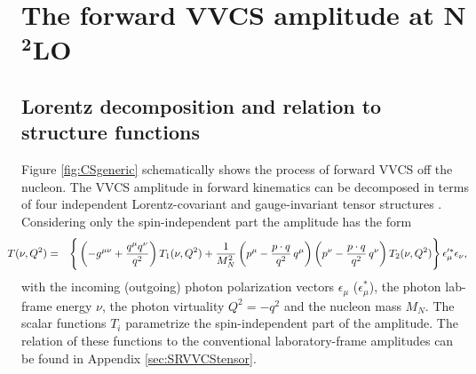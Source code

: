 \documentclass[11pt,preprint,tightenlines,
showpacs,preprintnumbers,amsmath,amssymb,superscriptaddress,a4paper,nofootinbib]{revtex4-1}
\def\bea{\begin{eqnarray}}
\def\eea{\end{eqnarray}}
\def\eqlab#1{\label{eq:#1}}
\def\seclab#1{\label{sec:#1}}
\def\nn{\nonumber}
\begin{document}
\section{The forward VVCS amplitude at N$\boldsymbol{^2}$LO} 
\label{Sec:ChEFT_for_VVCS}



\subsection{Lorentz decomposition and relation to structure functions} \seclab{LorentzDecomp}

Figure \ref{fig:CSgeneric} schematically shows the process of forward VVCS off the nucleon. 
The VVCS amplitude in forward kinematics can be decomposed in terms of four
independent Lorentz-covariant and gauge-invariant tensor structures
\cite{Hagelstein:2015egb}. Considering only the spin-independent part the amplitude has the form
\bea
\label{Eq:T-Rel}
\hspace{-0.5cm}T(\nu,Q^2) & = &  \Bigg\{ 
\left( -g^{\mu\nu}+\frac{q^{\mu}q^{\nu}}{q^2}\right)
T_1(\nu, Q^2) +\frac{1}{M_N^2} \left(p^{\mu}-\frac{p\cdot
q}{q^2}\,q^{\mu}\right) \left(p^{\nu}-\frac{p\cdot
q}{q^2}\, q^{\nu} \right) T_2(\nu, Q^2)\eqlab{fVVCS}\Bigg\}\,\epsilon_{\mu}^{\prime *} \epsilon_\nu ,
\nn
\eea
with the incoming (outgoing) photon polarization vectors $\epsilon_\mu$ ($\epsilon_\mu^*$), the photon lab-frame energy $\nu$, the photon virtuality $Q^2=-q^2$ and the nucleon mass $M_N$.
The scalar functions $T_i$ parametrize the spin-independent part
of the amplitude. The relation of these functions to the conventional
laboratory-frame amplitudes can be found in Appendix
\ref{sec:SRVVCStensor}.
\end{document}
